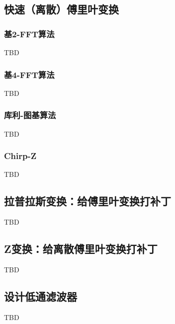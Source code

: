 \documentclass[main.tex]{subfiles}
\begin{document}
\subsection{快速（离散）傅里叶变换}
\subsubsection{基2-FFT算法}
TBD
\subsubsection{基4-FFT算法}
TBD
\subsubsection{库利-图基算法}
TBD
\subsubsection{Chirp-Z}
TBD

\subsection{拉普拉斯变换：给傅里叶变换打补丁}
TBD

\subsection{Z变换：给离散傅里叶变换打补丁}
TBD

\subsection{设计低通滤波器}
TBD
\end{document}
